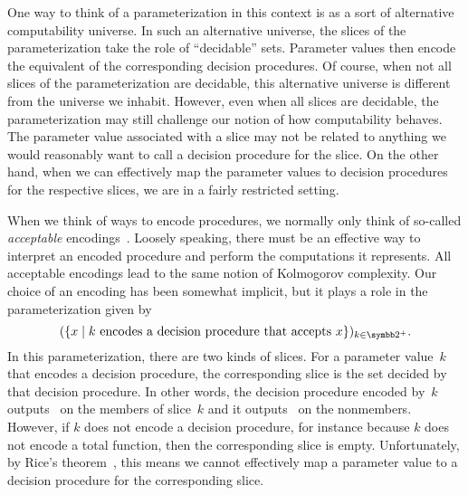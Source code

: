 One way to think of a parameterization in this context is as a sort of alternative computability universe.
In such an alternative universe, the slices of the parameterization take the role of \enquote{decidable} sets.
Parameter values then encode the equivalent of the corresponding decision procedures.
Of course, when not all slices of the parameterization are decidable, this alternative universe is different from the universe we inhabit.
However, even when all slices are decidable, the parameterization may still challenge our notion of how computability behaves.
The parameter value associated with a slice may not be related to anything we would reasonably want to call a decision procedure for the slice.
On the other hand, when we can effectively map the parameter values to decision procedures for the respective slices, we are in a fairly restricted setting.
\begin{example}
\label{ex:decision_parameterization}%
  When we think of ways to encode procedures, we normally only think of so-called \emph{acceptable} encodings~\parencite{rogers1967theory}.
  Loosely speaking, there must be an effective way to interpret an encoded procedure and perform the computations it represents.
  All acceptable encodings lead to the same notion of Kolmogorov complexity.
  Our choice of an encoding has been somewhat implicit, but it plays a role in the parameterization given by
  \begin{equation}
  \label{eq:decision_parameterization}
    (\{x \st \text{$k$ encodes a decision procedure that accepts $x$}\})_{k \in \binary^+}.
  \end{equation}
  In this parameterization, there are two kinds of slices.
  For a parameter value~$k$ that encodes a decision procedure, the corresponding slice is the set decided by that decision procedure.
  In other words, the decision procedure encoded by~$k$ outputs~ on the members of slice~$k$ and it outputs~ on the nonmembers.
  However, if $k$ does not encode a decision procedure, for instance because $k$ does not encode a total function, then the corresponding slice is empty.
  Unfortunately, by Rice's theorem~\parencite{rice1953classes}, this means we cannot effectively map a parameter value to a decision procedure for the corresponding slice.
\end{example}


